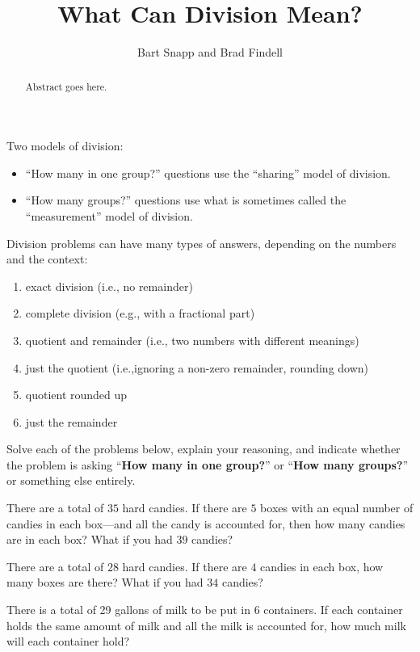 \documentclass{ximera}
\title{What Can Division Mean?}
\author{Bart Snapp and Brad Findell}
\begin{document}
\begin{abstract}
Abstract goes here.  
\end{abstract}
\maketitle

\label{A:dm}
\begin{teachingnote}
Two models of division:  
\begin{itemize}
\item ``How many in one group?'' questions use the ``sharing'' model of division.  
\item ``How many groups?'' questions use what is sometimes called the ``measurement'' model of division.  
\end{itemize}
Division problems can have many types of answers, depending on the numbers and the context:
\begin{enumerate}
\item exact division (i.e., no remainder)
\item complete division (e.g., with a fractional part)
\item quotient and remainder (i.e., two numbers with different meanings)
\item just the quotient (i.e.,ignoring a non-zero remainder, rounding down)
\item quotient rounded up 
\item just the remainder
\end{enumerate}
\end{teachingnote}
Solve each of the problems below, explain your reasoning, and indicate whether the problem is asking ``\textbf{How many in one group?}'' or ``\textbf{How many groups?}'' or something else entirely.

\begin{problem}
There are a total of $35$ hard candies. If there are $5$ boxes with an
equal number of candies in each box---and all the candy is accounted
for, then how many candies are in each box? What if you had $39$
candies?
\end{problem}

\begin{problem}
There are a total of $28$ hard candies. If there are $4$ candies in
each box, how many boxes are there? What if you had $34$ candies?
\end{problem}


\begin{problem}
There is a total of 29 gallons of milk to be put in 6 containers.  If
each container holds the same amount of milk and all the milk is
accounted for, how much milk will each container hold?
\end{problem}
\end{document}
